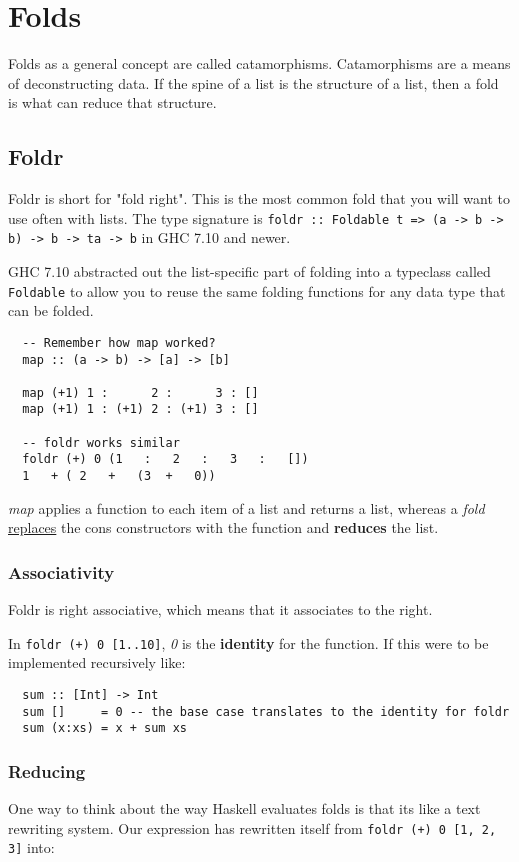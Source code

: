 \section{Folds}
Folds as a general concept are called catamorphisms. Catamorphisms are a means of deconstructing data. If the spine of a list is the structure of a list, then a fold is what can reduce that structure.

\subsection{Foldr}
Foldr is short for "fold right". This is the most common fold that you will want to use often with lists. The type signature is \texttt{foldr :: Foldable t => (a -> b -> b) -> b -> ta -> b} in GHC 7.10 and newer.

GHC 7.10 abstracted out the list-specific part of folding into a typeclass called \texttt{Foldable} to allow you to reuse the same folding functions for any data type that can be folded.

\begin{lstlisting}
  -- Remember how map worked?
  map :: (a -> b) -> [a] -> [b]

  map (+1) 1 :      2 :      3 : []
  map (+1) 1 : (+1) 2 : (+1) 3 : []

  -- foldr works similar
  foldr (+) 0 (1   :   2   :   3   :   [])
  1   + ( 2   +   (3  +   0))
\end{lstlisting}

\emph{map} applies a function to each item of a list and returns a list, whereas a \emph{fold} \underline{replaces} the cons constructors with the function and \textbf{reduces} the list.

\subsubsection{Associativity}
Foldr is right associative, which means that it associates to the right.

In \texttt{foldr (+) 0 [1..10]}, \emph{0} is the \textbf{identity} for the function. If this were to be implemented recursively like:

\begin{lstlisting}
  sum :: [Int] -> Int
  sum []     = 0 -- the base case translates to the identity for foldr
  sum (x:xs) = x + sum xs 
\end{lstlisting}

\newpage
\subsubsection{Reducing}
One way to think about the way Haskell evaluates folds is that its like a text rewriting system. Our expression has rewritten itself from \texttt{foldr (+) 0 [1, 2, 3]} into:

